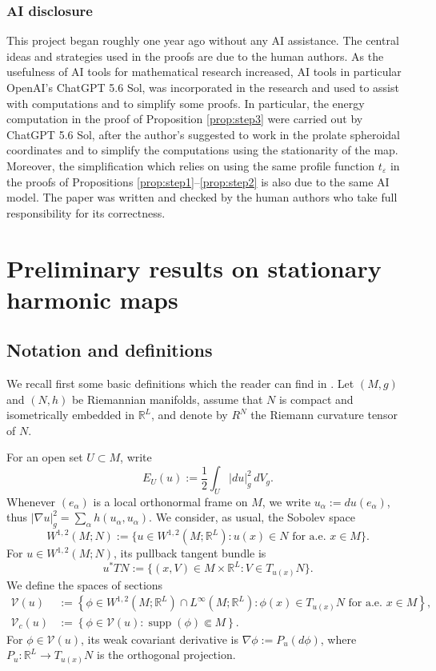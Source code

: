 \documentclass[11pt]{article}
\theoremstyle{plain}
\numberwithin{equation}{section}
\theoremstyle{definition}
\def \R {\mathbb{R}}
\def \mc{\mathcal}
\newcommand{\eps}{\varepsilon}
\DeclareMathOperator{\supp}{supp}
\begin{document}
\subsubsection*{AI disclosure}
This project began roughly one year ago without any AI assistance. The central ideas and strategies used in the proofs are due to the human authors. As the usefulness of AI tools for mathematical research increased, AI tools in particular OpenAI's ChatGPT 5.6 Sol, was incorporated in the research and used to assist with computations and to simplify some proofs. In particular, the energy computation in the proof of Proposition \ref{prop:step3} were carried out by ChatGPT 5.6 Sol, after the author's suggested to work in the prolate spheroidal coordinates and to simplify the computations using the stationarity of the map. Moreover, the simplification which relies on using the same profile function $t_\eps$ in the proofs of Propositions \ref{prop:step1}--\ref{prop:step2} is also due to the same AI model. The paper was written and checked by the human authors who take full responsibility for its correctness. 

\clearpage

\section{Preliminary results on stationary harmonic maps}
\label{sec:prelims}

\subsection{Notation and definitions}

 We recall first some basic definitions which the reader can find in \cite{Lin2008,Simon1996}. Let $(M,g)$ and $(N,h)$ be
Riemannian manifolds, assume that $N$ is compact and isometrically embedded
in $\R^L$,
and denote by $R^N$ the Riemann curvature tensor of $N$.
 
 For an open set
$U\subset M$, write
\[
E_U(u):= \frac12\int_U |d u|_g^2\,dV_g .
\]
Whenever $(e_\alpha)$ is a local orthonormal frame on $M$, we write $u_\alpha:=du(e_\alpha)$, thus
$|\nabla u|_g^2=\sum_\alpha h(u_\alpha,u_\alpha)$.  
We consider, as usual, the Sobolev space
\[
W^{1,2}(M;N):=\{u\in W^{1,2}(M;\R^L):u(x) \in N
\text{ for a.e.\ } x\in M\}.
\]
For $u\in W^{1,2}(M;N)$, its pullback tangent bundle is
\[
    u^*TN
    :=\{(x,V)\in M\times\R^L:V\in T_{u(x)}N\}.
\]
We define the spaces of sections
\begin{align*}
    \mc V(u)
    &:={\left\{\phi\in W^{1,2}(M;\R^L)\cap L^\infty(M;\R^L):
          \phi(x)\in T_{u(x)}N\text{ for a.e.\ }x\in M\right\}},\\
    \mc V_c(u)
    &:={\left\{\phi\in\mc V(u):\supp(\phi)\Subset M\right\}}.
\end{align*}
For $\phi\in\mc V(u)$, its weak covariant derivative is
$\nabla\phi:=P_u(d\phi)$, where
$P_u\colon\R^L\to T_{u(x)}N$ is the orthogonal projection.
\end{document}
